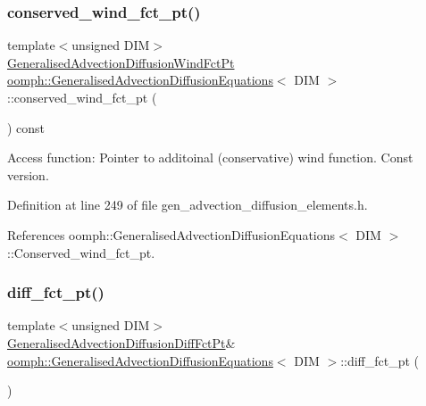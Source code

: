 \subsubsection{\texorpdfstring{conserved\+\_\+wind\+\_\+fct\+\_\+pt()}{conserved\_wind\_fct\_pt()}\hspace{0.1cm}{\footnotesize\ttfamily [2/2]}}
{\footnotesize\ttfamily template$<$unsigned D\+IM$>$ \\
\hyperlink{classoomph_1_1GeneralisedAdvectionDiffusionEquations_ac5a63eb03aee5957e7b14a4578423cfc}{Generalised\+Advection\+Diffusion\+Wind\+Fct\+Pt} \hyperlink{classoomph_1_1GeneralisedAdvectionDiffusionEquations}{oomph\+::\+Generalised\+Advection\+Diffusion\+Equations}$<$ D\+IM $>$\+::conserved\+\_\+wind\+\_\+fct\+\_\+pt (\begin{DoxyParamCaption}{ }\end{DoxyParamCaption}) const\hspace{0.3cm}{\ttfamily [inline]}}



Access function\+: Pointer to additoinal (conservative) wind function. Const version. 



Definition at line 249 of file gen\+\_\+advection\+\_\+diffusion\+\_\+elements.\+h.



References oomph\+::\+Generalised\+Advection\+Diffusion\+Equations$<$ D\+I\+M $>$\+::\+Conserved\+\_\+wind\+\_\+fct\+\_\+pt.

\mbox{\label{classoomph_1_1GeneralisedAdvectionDiffusionEquations_aa0d22a83b060ea55524c198f7be2c73c}} 
\subsubsection{\texorpdfstring{diff\+\_\+fct\+\_\+pt()}{diff\_fct\_pt()}\hspace{0.1cm}{\footnotesize\ttfamily [1/2]}}
{\footnotesize\ttfamily template$<$unsigned D\+IM$>$ \\
\hyperlink{classoomph_1_1GeneralisedAdvectionDiffusionEquations_a637371a9eebc399023c6a652e8219263}{Generalised\+Advection\+Diffusion\+Diff\+Fct\+Pt}\& \hyperlink{classoomph_1_1GeneralisedAdvectionDiffusionEquations}{oomph\+::\+Generalised\+Advection\+Diffusion\+Equations}$<$ D\+IM $>$\+::diff\+\_\+fct\+\_\+pt (\begin{DoxyParamCaption}{ }\end{DoxyParamCaption})\hspace{0.3cm}{\ttfamily [inline]}}



